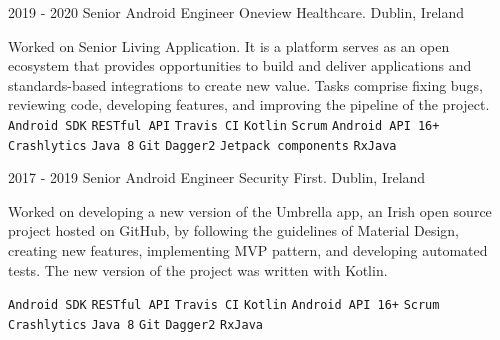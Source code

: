 \documentclass[9pt]{developercv} %
\begin{document}
\begin{entrylist}
	\entry
		{2019 -  2020}
		{Senior Android Engineer}
		{Oneview Healthcare. Dublin, Ireland}
{

Worked on Senior Living Application. It is a platform serves as an open ecosystem that provides opportunities to build and deliver applications and standards-based integrations to create new value. Tasks comprise fixing bugs, reviewing code, developing features, and improving the pipeline of the project.
\newline
 	{
 		\texttt{Android SDK}\slashsep
		 \texttt{RESTful API}\slashsep
		 \texttt{Travis CI}\slashsep
		 \texttt{Kotlin}\slashsep
		 \texttt{Scrum}\slashsep
		 \texttt{Android API 16+}\slashsep
		 \texttt{Crashlytics}\slashsep
		 \texttt{Java 8}\slashsep
		 \texttt{Git}\slashsep
		 \texttt{Dagger2}\slashsep
		 \texttt{Jetpack components}\slashsep
		 \texttt{RxJava}\slashsep
	}
}
\end{entrylist}
\begin{entrylist}
	\entry
		{2017 -  2019}
		{Senior Android Engineer}
		{Security First. Dublin, Ireland}
{
Worked on developing a new version of the Umbrella app, an Irish open source project hosted on GitHub, by following the guidelines of Material Design, creating new features, implementing MVP pattern, and developing automated tests. The new version of the project was written with Kotlin.

 	{
 		\texttt{Android SDK}\slashsep
		 \texttt{RESTful API}\slashsep
		 \texttt{Travis CI}\slashsep
		 \texttt{Kotlin}\slashsep
		 \texttt{Android API 16+}\slashsep
		 \texttt{Scrum}\slashsep
		 \texttt{Crashlytics}\slashsep
		 \texttt{Java 8}\slashsep
		 \texttt{Git}\slashsep
		 \texttt{Dagger2}\slashsep
		 \texttt{RxJava}\slashsep
	}
}
\end{entrylist}
\end{document}
